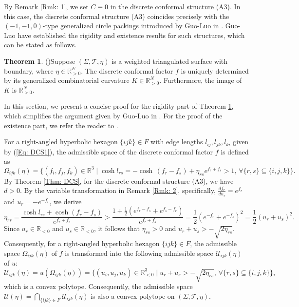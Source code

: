 \documentclass[12pt]{amsart}
\theoremstyle{definition}
\newtheorem{theorem}{Theorem}[section]
\begin{document}
By Remark \ref{Rmk: 1}, we set $C\equiv 0$ in the discrete conformal structure (A3).
In this case, the discrete conformal structure (A3) coincides precisely with the $(-1,-1,0)$-type generalized circle packings introduced by Guo-Luo in \cite{GL2}. 
Guo-Luo \cite{GL2} have established the rigidity and existence results for such structures, which can be stated as follows.

\begin{theorem}(\cite{GL2})\label{Thm: GL-rigidity}
Suppose $(\Sigma,\mathcal{T},\eta)$ is a weighted triangulated surface with boundary, where $\eta\in \mathbb{R}_{>0}^E$.
The discrete conformal factor $f$ is uniquely determined by its generalized combinatorial curvature $K\in \mathbb{R}^N_{>0}$.
Furthermore, the image of $K$ is $\mathbb{R}_{>0}^N$.
\end{theorem}

In this section, we present a concise proof for the rigidity part of Theorem \ref{Thm: GL-rigidity}, 
which simplifies the argument given by Guo-Luo in \cite{GL2}. 
For the proof of the existence part, we refer the reader to \cite{GL2}.

For a right-angled hyperbolic hexagon $\{ijk\}\in F$ with edge lengths $l_{ij}, l_{jk}, l_{ki}$ given by (\ref{Eq: DCS1}),
the admissible space of the discrete conformal factor $f$ is defined as
\begin{equation*}
\Omega_{ijk}(\eta)=\{(f_i,f_j,f_k)\in \mathbb{R}^3 \mid \cosh l_{rs}=-\cosh\,(f_r-f_s)+\eta_{rs}e^{f_r+f_s}>1,\,  \forall\{r,s\}\subseteq\{i,j,k\}\}.
\end{equation*}
By Theorem \ref{Thm: DCS}, for the discrete conformal structure (A3), we have $d>0$.
By the variable transformation in Remark \ref{Rmk: 2}, specifically, $\frac{d f_r}{d u_r}=e^{f_r}$ and $u_r=-e^{-f_r}$, we derive
\begin{equation*}
\eta_{rs}=\frac{\cosh l_{rs}+\cosh(f_r-f_s)}{e^{f_r+f_s}}
>\frac{1+\frac{1}{2}(e^{f_r-f_s}+e^{f_s-f_r})}{e^{f_r+f_s}}
=\frac{1}{2}(e^{-f_r}+e^{-f_s})^2
=\frac{1}{2}(u_r+u_s)^2.
\end{equation*}
Since $u_r\in \mathbb{R}_{<0}$ and $u_s\in \mathbb{R}_{<0}$, 
it follows that $\eta_{rs}>0$ and $u_r+u_s>-\sqrt{2\eta_{rs}}$.
Consequently, for a right-angled hyperbolic hexagon $\{ijk\}\in F$,
the admissible space $\Omega_{ijk}(\eta)$ of $f$ is transformed into the following admissible space $\mathcal{U}_{ijk}(\eta)$ of $u$:
\begin{equation}\label{Eq: F12}
\mathcal{U}_{ijk}(\eta)=u(\Omega_{ijk}(\eta))
=\{(u_i,u_j,u_k)\in \mathbb{R}_{<0}^3 \mid u_r+u_s>-\sqrt{2\eta_{rs}}, \, \forall\{r,s\}\subseteq\{i,j,k\} \},
\end{equation}
which is a convex polytope.
Consequently, the admissible space $\mathcal{U}(\eta)=\bigcap_{\{ijk\}\in F}\mathcal{U}_{ijk}(\eta)$ is also a convex polytope on $(\Sigma,\mathcal{T},\eta)$.
\end{document}

